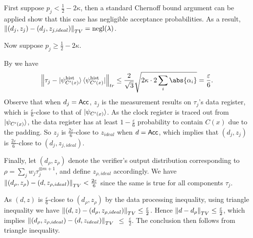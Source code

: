 \begin{prf}
	First suppose $p_j<\frac{1}{2}-2\kappa$,
	then a standard Chernoff bound argument can be applied show that this case has negligible acceptance probabilities.
	As a result, $\left\lVert(d_j, z_j)-(d_j, z_{j, ideal})\right\rVert_{TV}=\operatorname{negl}(\lambda)$.

	Now suppose $p_j\geq\frac{1}{2}-2\kappa$.
	\iffalse
	By \Cref{cor:HamCheck} we have a lower bound for the fidelity between $\tau_j$ and $\ket{\psi_{C'(x)}}$:
	$$p_j>\frac{1}{2}-2\kappa\Rightarrow F(\tau_j, \ket{\psi_{C'(x)}}\bra{\psi_{C'(x)}})\geq1-\frac{\varepsilon^2}{36}.$$
	which in turn implies a lower bound on the respective trace distance:
	$$\norm{\tau_j - \ket{\psi_{C'(x)}}\bra{\psi_{C'(x)}}}_{tr}<\frac{\varepsilon}{6}.$$
	\fi
	By  we have
	$$\norm{\tau_j - \ket{\psi^{\mathrm{hist}}_{C'(x)}}\bra{\psi^{\mathrm{hist}}_{C'(x)}}}_{tr}\leq\frac{2}{\sqrt{3}}\sqrt{2\kappa\cdot2\sum_i\abs{\alpha_i}}=\frac{\varepsilon}{6}.$$
	Observe that when $d_j=\mathsf{Acc}$, $z_j$ is the measurement results on $\tau_j$'s data register,
	which is $\frac{\varepsilon}{6}$-close to that of $\ket{\psi_{C'(x)}}$.
	As the clock register is traced out from $\ket{\psi_{C'(x)}}$, the data register has at least $1-\frac{\varepsilon}{6}$ probability to contain $C(x)$ due to the padding.
	So $z_j$ is $\frac{2\varepsilon}{6}$-close to $z_{ideal}$ when $d=\mathsf{Acc}$,
	which implies that $(d_j, z_j)$ is $\frac{2\varepsilon}{6}$-close to $(d_j, z_{j, ideal})$.

    Finally, let $(d_\rho, z_\rho)$ denote the verifier's output distribution corresponding to $\rho=\sum_j w_j\tau_j^{\otimes m+1}$,
	and define $z_{\rho, ideal}$ accordingly.
	We have $\left\lVert(d_\rho, z_\rho) - (d, z_{\rho, ideal})\right\rVert_{TV} < \frac{2\varepsilon}{6}$ since the same is true for all components $\tau_j$.

	As $(d, z)$ is $\frac{\varepsilon}{6}$-close to $(d_\rho, z_\rho)$ by the data processing inequality,
	using triangle inequality we have $\left\lVert(d, z) - (d_\rho, z_{\rho, ideal})\right\rVert_{TV}\leq\frac{\varepsilon}{2}$.
	Hence $\left\lVert d - d_\rho\right\rVert_{TV}\leq\frac{\varepsilon}{2}$, which implies $\left\lVert(d_\rho, z_{\rho, ideal}) - (d, z_{ideal})\right\rVert_{TV}$ $\leq$ $\frac{\varepsilon}{2}$.
	The conclusion then follows from triangle inequality.
\end{prf}
